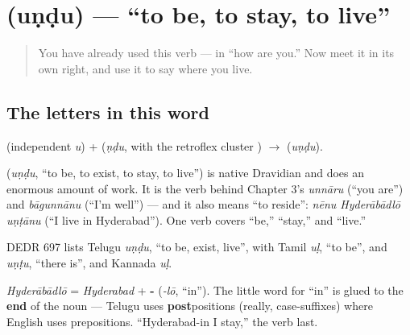 \section[\texorpdfstring{\te{ఉండు} (uṇḍu)}{ఉండు (uṇḍu)}]{ (uṇḍu) — \textquotedblleft{}to be, to stay, to live\textquotedblright{}}

\label{lesson:TE-C05-undu}



\begin{quote}
You have already used this verb — in \textquotedblleft{}how are you.\textquotedblright{} Now meet it in its own right, and use it to say where you live.
\end{quote}

\subsection*{The letters in this word}
\textbf{} (independent \emph{u}) + \textbf{} (\emph{ṇḍu}, with the retroflex cluster \textbf{}) $\to$ \textbf{} (\emph{uṇḍu}).

\begin{cousinweb}
\textbf{} (\emph{uṇḍu}, \textquotedblleft{}to be, to exist, to stay, to live\textquotedblright{}) is native Dravidian and does an enormous amount of work. It is the verb behind Chapter 3's \emph{unnāru} (\textquotedblleft{}you are\textquotedblright{}) and \emph{bāgunnānu} (\textquotedblleft{}I'm well\textquotedblright{}) — and it also means \textquotedblleft{}to reside\textquotedblright{}: \emph{nēnu Hyderābādlō uṇṭānu} (\textquotedblleft{}I live in Hyderabad\textquotedblright{}). One verb covers \textquotedblleft{}be,\textquotedblright{} \textquotedblleft{}stay,\textquotedblright{} and \textquotedblleft{}live.\textquotedblright{}

DEDR 697 lists Telugu \emph{uṇḍu}, \textquotedblleft{}to be, exist, live\textquotedblright{}, with Tamil \emph{uḷ}, \textquotedblleft{}to be\textquotedblright{}, and \emph{uṇṭu}, \textquotedblleft{}there is\textquotedblright{}, and Kannada \emph{uḷ}.
\end{cousinweb}

\begin{grammarlens}[title={Grammar Lens: \textquotedblleft{}in\textquotedblright{} comes after the noun}]
\emph{Hyderābādlō} = \emph{Hyderabad} + \textbf{-} (\emph{-lō}, \textquotedblleft{}in\textquotedblright{}). The little word for \textquotedblleft{}in\textquotedblright{} is glued to the \textbf{end} of the noun — Telugu uses \textbf{post}positions (really, case-suffixes) where English uses prepositions. \textquotedblleft{}Hyderabad-in I stay,\textquotedblright{} the verb last.
\end{grammarlens}

